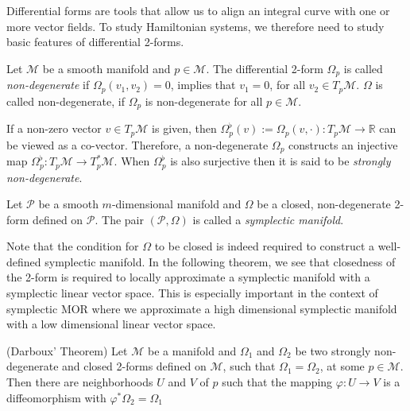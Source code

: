 Differential forms are tools that allow us to align an integral curve with one or more vector fields. To study Hamiltonian systems, we therefore need to study basic features of differential 2-forms.

\begin{definition}
	Let $\mathcal M$ be a smooth manifold and $p\in \mathcal M$. The differential 2-form $\Omega_p$ is called \emph{non-degenerate} if $\Omega_p(v_1,v_2)=0$, implies that $v_1 = 0$, for all $v_2\in T_p \mathcal M$. $\Omega$ is called non-degenerate, if $\Omega_p$ is non-degenerate for all $p\in \mathcal M$.
\end{definition}
If a non-zero vector $v\in T_p \mathcal M$ is given, then $\Omega_p^{\flat}(v):=\Omega_p(v,\cdot):T_p \mathcal M \to \mathbb R$ can be viewed as a co-vector. Therefore, a non-degenerate $\Omega_p$ constructs an injective map $\Omega_p^{\flat}:T_p\mathcal M \to T_p^* \mathcal M$. When $\Omega_p^{\flat}$ is also surjective then it is said to be \emph{strongly non-degenerate}. 

\begin{definition}
	Let $\mathcal P$ be a smooth $m$-dimensional manifold and $\Omega$ be a closed, non-degenerate 2-form defined on $\mathcal P$. The pair $(\mathcal P,\Omega)$ is called a \emph{symplectic manifold}.
\end{definition}
Note that the condition for $\Omega$ to be closed is indeed required to construct a well-defined symplectic manifold. In the following theorem, we see that closedness of the 2-form is required to locally approximate a symplectic manifold with a symplectic linear vector space. This is especially important in the context of symplectic MOR where we approximate a high dimensional symplectic manifold with a low dimensional linear vector space.

\begin{theorem} \label{theorem:2.5}
(Darboux' Theorem) Let $\mathcal M$ be a manifold and $\Omega_1$ and $\Omega_2$ be two strongly non-degenerate and closed 2-forms defined on $\mathcal M$, such that $\Omega_1 = \Omega_2$, at some $p\in \mathcal M$. Then there are neighborhoods $U$ and $V$ of $p$ such that the mapping $\varphi:U\to V$ is a diffeomorphism with $\varphi^* \Omega_2 = \Omega_1$
\end{theorem}

